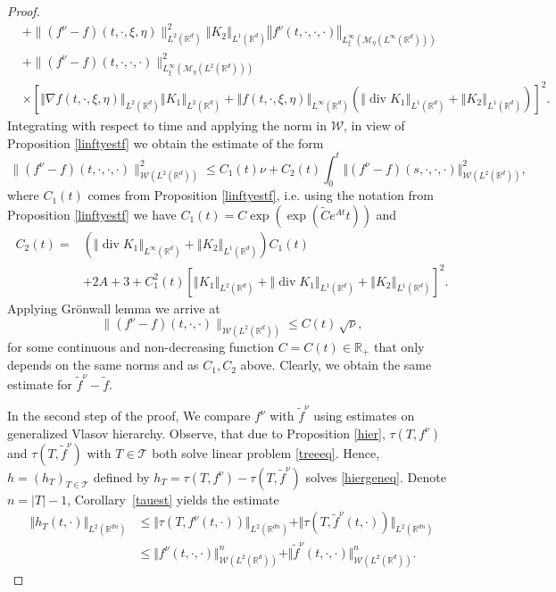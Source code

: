 \documentclass[10pt]{article}
\def\divv{\operatorname {div}}
\newcommand*{\norm}[1]{\left\Vert{#1}\right\Vert}
\newcommand{\R}{\mathbb{R}}
\newcommand{\Tree}{\mathcal{T}}
\newcommand{\W}{\mathcal{W}}
\begin{document}
\begin{proof}
\begin{align*}
    &
    +\| (f^\nu-f)(t, \cdot, \xi,\eta)\|_{L^2(\R^d)}^2 \norm{K_{2}}_{L^{1}(\R^d)}\norm{f^\nu(t,\cdot,\cdot,\cdot)}_{L^{\infty}_\xi(\mathcal{M}_{\eta}(L^{\infty}(\R^d)))}\\
    &+\| (f^\nu-f)(t, \cdot, \cdot,\cdot)\|_{L^{\infty}_\xi (\mathcal{M}_{\eta}(L^2(\R^d)))}^2\\
    & \times \left[\norm{\nabla f(t,\cdot,\xi,\eta)}_{L^{2}(\R^d)}\norm{K_1}_{L^{2}(\R^d)} + \norm{f(t,\cdot,\xi,\eta)}_{L^{\infty}(\R^d)}(\norm{\divv K_1}_{L^{1}(\R^d)} + \norm{ K_2}_{L^{1}(\R^d)})\right]^2.
\end{align*}
Integrating with respect to time and applying the norm in $\W$, in view of  Proposition \ref{linftyestf} we obtain the estimate of the form
\[
\,\| (f^\nu-f)(t, \cdot, \cdot,\cdot)\|_{\W(L^2(\R^d))}^2 \leq C_1(t)\nu + C_2(t) \int_0^t \Vert (f^\nu- f)(s,\cdot,\cdot,\cdot)\Vert_{\W(L^2(\R^d))}^2, 
\]
where $C_1(t)$ comes from Proposition \ref{linftyestf}, i.e. using the notation from Proposition \ref{linftyestf} we have $C_1(t)=C \exp(\exp(\tilde{C}e^{At}t))$ and 
\begin{align*}
  C_2(t) = &(\norm{\divv K_1}_{L^{\infty}(\R^d)} + \norm{K_{2}}_{L^{1}(\R^d)})C_1(t)  \\
  &+ 2A+3 +C_1^2(t)\left[\norm{K_1}_{L^{2}(\R^d)} + \norm{\divv K_1}_{L^{1}(\R^d)} + \norm{ K_2}_{L^{1}(\R^d)}\right]^2.
\end{align*}
Applying Gr\"onwall lemma we arrive at
  \begin{equation}\label{aproxst}
\| (f^\nu - f)(t,\cdot,\cdot)\|_{\W(L^2(\R^d))} \leq C(t)\,\sqrt{\nu},
  \end{equation}
for some continuous and non-decreasing function $C=C(t)\in \R_+$ that only depends on the same norms and as $C_1,C_2$ above. Clearly, we obtain  the same estimate for $\tilde f^\nu -\tilde f$. 

In the second step of the proof, We compare  $f^\nu$ with $\tilde{f}^\nu$ using estimates on generalized Vlasov hierarchy. Observe, that due to  Proposition \ref{hier},  $\tau(T, f^\nu)$ and $\tau(T, \tilde f^\nu)$ with $T\in \Tree$ both solve linear problem \eqref{treeeq}. Hence,  $h=(h_T)_{T\in \Tree}$ defined by $h_T=\tau(T,  f^\nu) - \tau(T,\tilde f^\nu)$ solves \eqref{hiergeneq}. Denote $n=|T|-1$, Corollary~\ref{tauest} yields the estimate
\begin{align*}
\Vert h_T(t,\cdot)\Vert_{L^2(\R^{d n})}&\leq \Vert \tau(T,f^\nu(t,\cdot))\Vert_{L^2(\R^{d n})}+\Vert \tau(T,\tilde{f}^\nu(t,\cdot))\Vert_{L^2(\R^{d n})}\\
&\leq \Vert f^\nu(t,\cdot,\cdot)\Vert_{\W(L^2(\R^d))}^{n}+\Vert \tilde f^\nu(t,\cdot,\cdot)\Vert_{\W(L^2(\R^d))}^{n}.
\end{align*}



\end{proof}
\end{document}
